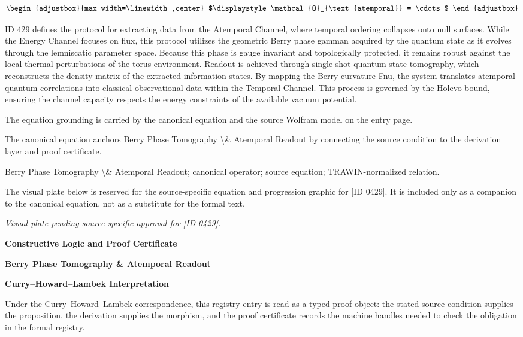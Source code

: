 \[
\begin{adjustbox}{max width=\linewidth,center}
$\displaystyle
\mathcal{O}_{\text{atemporal}} = \cdots
$
\end{adjustbox}
\]

ID 429 defines the protocol for extracting data from the Atemporal Channel, where temporal ordering collapses onto null surfaces. While the Energy Channel focuses on flux, this protocol utilizes the geometric Berry phase gamman acquired by the quantum state as it evolves through the lemniscatic parameter space. Because this phase is gauge invariant and topologically protected, it remains robust against the local thermal perturbations of the torus environment. Readout is achieved through single shot quantum state tomography, which reconstructs the density matrix of the extracted information states. By mapping the Berry curvature Fnu, the system translates atemporal quantum correlations into classical observational data within the Temporal Channel. This process is governed by the Holevo bound, ensuring the channel capacity respects the energy constraints of the available vacuum potential.

The equation grounding is carried by the canonical equation and the source Wolfram model on the entry page.

The canonical equation anchors Berry Phase Tomography \textbackslash{}\& Atemporal Readout by connecting the source condition to the derivation layer and proof certificate.

Berry Phase Tomography \textbackslash{}\& Atemporal Readout; canonical operator; source equation; TRAWIN-normalized relation.
\endgroup

\begingroup\footnotesize\sloppy
The visual plate below is reserved for the source-specific equation and progression graphic for [ID 0429]. It is included only as a companion to the canonical equation, not as a substitute for the formal text.
\par\endgroup
\begingroup\footnotesize\itshape
Visual plate pending source-specific approval for [ID 0429].
\par\endgroup

\clearpage
\begingroup\tzpsupportsetup
\noindent\textbf{\fontsize{10.8pt}{12.8pt}\selectfont [ID 0429] Constructive Logic and Proof Certificate}\par
\noindent\textbf{\fontsize{10pt}{12pt}\selectfont Berry Phase Tomography \& Atemporal Readout}\par
\vspace{0.45em}
\begingroup
\footnotesize
\setlength{\parskip}{0.22em}
\setlength{\parindent}{0pt}
\noindent\textbf{Curry--Howard--Lambek Interpretation}\par
Under the Curry--Howard--Lambek correspondence, this registry entry is read as a typed proof
object: the stated source condition supplies the proposition, the derivation supplies the
morphism, and the proof certificate records the machine handles needed to check the obligation
in the formal registry.

